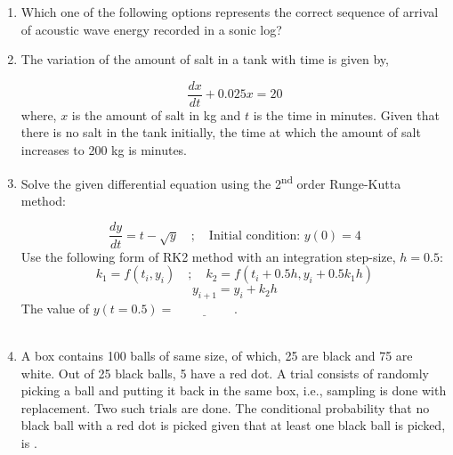 \documentclass[journal,12pt,onecolumn]{IEEEtran}
\theoremstyle{remark}
\begin{document}
\begin{enumerate}
\item Which one of the following options represents the correct sequence of arrival of acoustic wave energy recorded in a sonic log? 

\hfill{}

\begin{enumerate}
\end{enumerate}

\item The variation of the amount of salt in a tank with time is given by, 

\hfill{}

\[ \frac{dx}{dt} + 0.025x = 20 \]
where, $x$ is the amount of salt in kg and $t$ is the time in minutes. Given that there is no salt in the tank initially, the time at which the amount of salt increases to 200 kg is \underline{\hspace{2cm}} minutes. 

\pagebreak

\item Solve the given differential equation using the 2\textsuperscript{nd} order Runge-Kutta  method: 

\hfill{}

\[ \frac{dy}{dt} = t - \sqrt{y} \quad ; \quad \text{Initial condition: } y(0) = 4 \]
Use the following form of RK2 method with an integration step-size, $h = 0.5$:
\[ k_1 = f(t_i, y_i) \quad ; \quad k_2 = f(t_i + 0.5h, y_i + 0.5k_1 h) \]
\[ y_{i+1} = y_i + k_2 h \]
The value of $y(t = 0.5) = \underline{\hspace{2cm}}$. \\\\

\item A box contains 100 balls of same size, of which, 25 are black and 75 are white. Out of 25 black balls, 5 have a red dot. A trial consists of randomly picking a ball and putting it back in the same box, i.e., sampling is done with replacement. Two such trials are done. The conditional probability that no black ball with a red dot is picked given that at least one black ball is picked, is \underline{\hspace{2cm}}.  


\end{enumerate}
\end{document}
